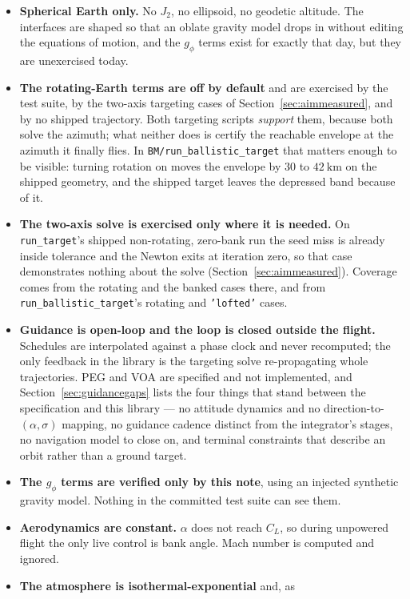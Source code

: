 \documentclass[11pt]{article}
\newcommand{\code}[1]{\texttt{#1}}
\begin{document}
\begin{itemize}
\item \textbf{Spherical Earth only.} No $J_2$, no ellipsoid, no geodetic
altitude. The interfaces are shaped so that an oblate gravity model drops in
without editing the equations of motion, and the $g_\phi$ terms exist for
exactly that day, but they are unexercised today.
\item \textbf{The rotating-Earth terms are off by default} and are exercised by
the test suite, by the two-axis targeting cases of
Section~\ref{sec:aimmeasured}, and by no shipped trajectory. Both targeting
scripts \emph{support} them, because both solve the azimuth; what neither does
is certify the reachable envelope at the azimuth it finally flies. In
\code{BM/run\_ballistic\_target} that matters enough to be visible: turning
rotation on moves the envelope by $30$ to $42~\mathrm{km}$ on the shipped
geometry, and the shipped target leaves the depressed band because of it.
\item \textbf{The two-axis solve is exercised only where it is needed.} On
\code{run\_target}'s shipped non-rotating, zero-bank run the seed miss is
already inside tolerance and the Newton exits at iteration zero, so that case
demonstrates nothing about the solve (Section~\ref{sec:aimmeasured}). Coverage
comes from the rotating and the banked cases there, and from
\code{run\_ballistic\_target}'s rotating and \code{'lofted'} cases.
\item \textbf{Guidance is open-loop and the loop is closed outside the flight.}
Schedules are interpolated against a phase clock and never recomputed; the only
feedback in the library is the targeting solve re-propagating whole
trajectories. PEG and VOA are specified and not implemented, and
Section~\ref{sec:guidancegaps} lists the four things that stand between the
specification and this library --- no attitude dynamics and no
direction-to-$(\alpha,\sigma)$ mapping, no guidance cadence distinct from the
integrator's stages, no navigation model to close on, and terminal constraints
that describe an orbit rather than a ground target.
\item \textbf{The $g_\phi$ terms are verified only by this note}, using an
injected synthetic gravity model. Nothing in the committed test suite can see
them.
\item \textbf{Aerodynamics are constant.} $\alpha$ does not reach $C_L$, so
during unpowered flight the only live control is bank angle. Mach number is
computed and ignored.
\item \textbf{The atmosphere is isothermal-exponential} and, as

\end{itemize}
\end{document}
